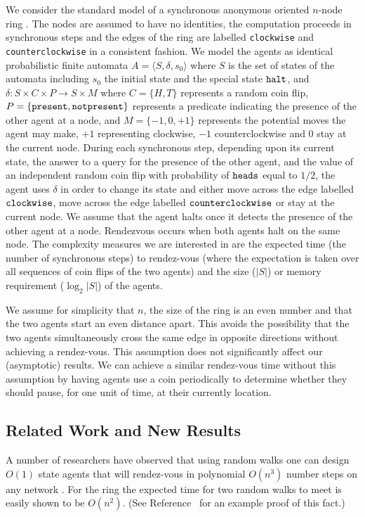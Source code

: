 \documentclass[acmtoalg]{acmtrans2m}
\begin{document}
We consider the standard model of a synchronous anonymous oriented
$n$-node ring \cite{santoro}. The nodes are assumed to have no identities,
the computation proceeds in synchronous steps and the edges of the ring
are labelled {\tt clockwise} and {\tt counterclockwise} in a consistent
fashion.  We model the agents as identical probabilistic finite automata
$A = \langle S, \delta, s_0 \rangle$ where $S$ is the set of states of
the automata including $s_0$ the initial state and the special state ${\tt
halt}$, and $\delta:S \times C \times P \to S \times M$ where $C = \{ H,
T \}$ represents a random coin flip, $P = \{ \tt present, notpresent \}$
represents a predicate indicating the presence of the other agent at a
node, and $M = \{ -1, 0, +1 \}$ represents the potential moves the agent
may make, $+1$ representing clockwise, $-1$ counterclockwise and $0$
stay at the current node.  During each synchronous step, depending upon
its current state, the answer to a query for the presence of the other
agent, and the value of an independent random coin flip with probability
of $\tt heads$ equal to $1/2$, the agent uses $\delta$ in order to change
its state and either move across the edge labelled $\tt clockwise$, move
across the edge labelled $\tt counterclockwise$ or stay at the current
node. We assume that the agent halts once it detects the presence of
the other agent at a node.  Rendezvous occurs when both agents halt on
the same node.  The complexity measures  we are interested in are the
expected time (the number of synchronous steps) to rendez-vous (where the
expectation is taken over all sequences of coin flips of the two agents)
and the size ($|S|$) or memory requirement ($\log_2 |S|$) of the agents.

We assume for simplicity that $n$, the size of the ring is an even number
and that the two agents start an even distance apart. This avoids the
possibility that the two agents simultaneously cross the same edge in
opposite directions without achieving a rendez-vous.  This assumption
does not significantly affect our (asymptotic) results.  We can achieve
a similar rendez-vous time without this assumption by having agents use
a coin periodically to determine whether they should pause, for one unit
of time, at their currently location.

\subsection{Related Work and New Results}

A number of researchers have observed that using random walks one can
design $O(1)$ state agents that will rendez-vous in polynomial $O(n^3)$
number steps on any network \cite{coppersmith}. For the ring the expected
time for two random walks to meet is easily shown to be $O(n^2)$. (See
Reference~\cite{kk} for an example proof of this fact.)
\end{document}
